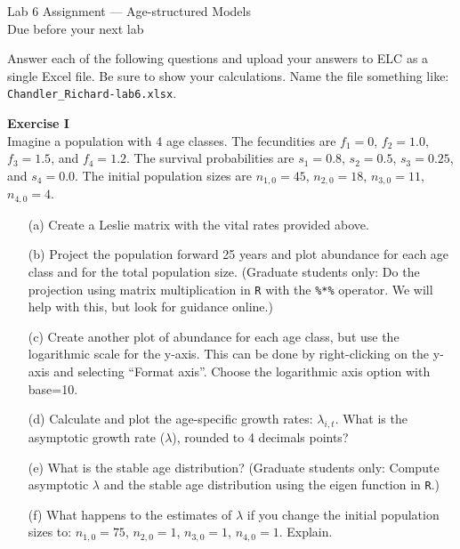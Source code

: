 \documentclass[12pt]{article}\usepackage[]{graphicx}\usepackage[]{color}
\begin{document}
{
  \Large
  \centering
  Lab 6 Assignment --- Age-structured Models \\
  Due before your next lab \par
}

Answer each of the following questions and upload your answers to ELC
as a single Excel file. Be sure to show your calculations. Name the
file something like: \texttt{Chandler\_Richard-lab6.xlsx}. \\



\vspace{12pt}

{\bf Exercise I \\}
Imagine a population with 4 age classes. The fecundities are $f_1=0$,
$f_2=1.0$, $f_3=1.5$, and $f_4=1.2$. The survival probabilities are
$s_1=0.8$, $s_2=0.5$, $s_3=0.25$, and $s_4=0.0$. The initial
population sizes are $n_{1,0}=45$, $n_{2,0}=18$, $n_{3,0}=11$, $n_{4,0}=4$.
\begin{itemize}
  \item[(a)] Create a Leslie matrix with the vital rates provided above.
  \item[(b)] Project the population forward 25 years and plot abundance for
    each age class and for the total population size. (Graduate students
    only: Do the projection using matrix multiplication in {\tt R} with
    the \texttt{\%*\%} operator. We will help with this, but look for
    guidance online.)
  \item[(c)] Create another plot of abundance for each age class, but use the
    logarithmic scale for the y-axis. This can be done by right-clicking
    on the y-axis and selecting ``Format axis''. Choose the logarithmic
    axis option with base=10.
  \item[(d)] Calculate and plot the age-specific
    growth rates: $\lambda_{i,t}$. What is the asymptotic growth rate
    ($\lambda$), rounded to 4 decimals points?
  \item[(e)] What is the stable age distribution? (Graduate students only:
    Compute asymptotic $\lambda$ and the stable age distribution using
    the eigen function in {\tt R}.)
  \item[(f)] What happens to the estimates of $\lambda$ if you change the
    initial population sizes to: $n_{1,0}=75$, $n_{2,0}=1$, $n_{3,0}=1$,
    $n_{4,0}=1$. Explain.
\end{itemize}



\vspace{12pt}
\end{document}
